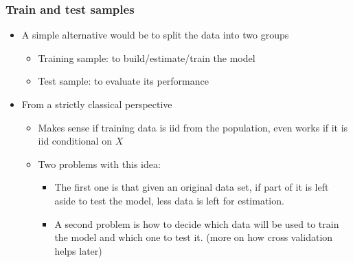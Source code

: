 \documentclass[
  shownotes,
  xcolor={svgnames},
  hyperref={colorlinks,citecolor=DarkBlue,linkcolor=DarkRed,urlcolor=DarkBlue}
  ]{beamer}
\begin{document}
\begin{frame}
\frametitle{Train and test samples}

\begin{itemize}
  \item A simple alternative would be to split the data into two groups
  \begin{itemize}
    \item  Training sample: to build/estimate/train the model
    \medskip
    \item  Test sample:  to evaluate its performance 
  \end{itemize}

\bigskip
\item From a strictly classical perspective 
\begin{itemize}
  \item Makes sense if training data is iid from the population, even works if it is iid conditional on $X$
  \medskip
  \item Two problems with this idea:
  \begin{itemize}
    \item  The first one is that given an original data set, if part of it is left aside to test the model, less data is left for estimation. 
    \item A second problem is how to decide which data will be used to train the model and which one to test it. {\tiny (more on how cross validation helps later)}
  \end{itemize}
\end{itemize}


 \end{itemize}


\end{frame}
\end{document}
